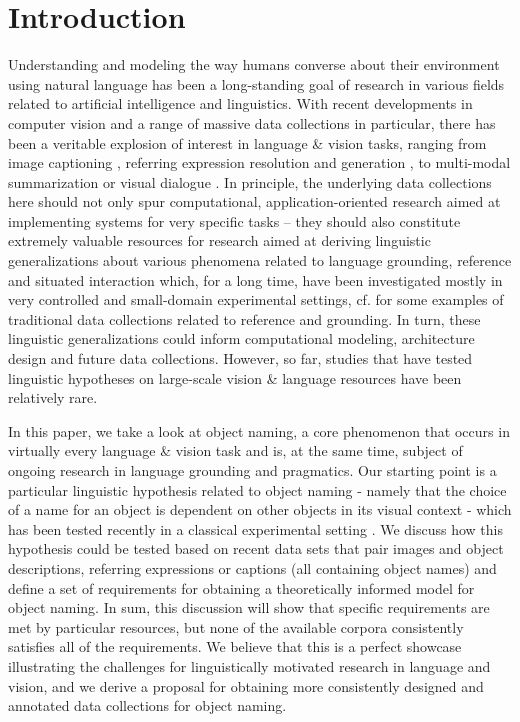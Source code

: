 \documentclass[runningheads]{llncs}
\begin{document}
\section{Introduction}

Understanding and modeling the way humans converse about their environment using natural language has been a long-standing goal of research in various fields related to artificial intelligence and linguistics.
With recent  developments in computer vision and a range of massive data collections in particular, there has been a veritable explosion of interest in language \& vision tasks, ranging from image captioning \cite{fangetal:2015,devlin:imcaqui,Bernardietal:automatic}, referring expression resolution and generation \cite{Kazemzadeh2014,mao15,Yu2016}, to multi-modal summarization or visual dialogue \cite{das2017visual,vries2017guesswhat}.
In principle, the underlying data collections here should not only spur computational, application-oriented research aimed at implementing systems for very specific tasks -- they should also constitute extremely valuable resources for research aimed at deriving linguistic generalizations about various phenomena related to language grounding, reference and situated interaction which, for a long time, have been investigated mostly in very controlled and small-domain experimental settings, cf. \cite{anderson1991hcrc,fernangen:sigd07,krahmer:2012,takenobu2012rex,zarriess2016pentoref} for some examples of traditional data collections related to reference and grounding.  
In turn, these linguistic generalizations could inform computational modeling, architecture design and future data collections.
However, so far, studies that have tested linguistic hypotheses on large-scale vision \& language resources have been relatively rare. 


In this paper, we take a look at object naming, a core phenomenon that occurs in virtually every language \& vision task and is, at the same time, subject of ongoing research in language grounding and pragmatics. 
Our starting point is a particular linguistic hypothesis related to object naming - namely that the choice of a name for an object is dependent on other objects in its visual context - which has been tested recently in a classical experimental setting \cite{graf2016animal}. 
We discuss how this hypothesis could be tested based on recent data sets that pair images and object descriptions, referring expressions or captions (all containing object names) and define a set of requirements for obtaining a theoretically informed model for object naming.
In sum, this discussion will show that specific requirements are met by particular resources, but none of the available corpora consistently satisfies all of the requirements.
We believe that this is a perfect showcase illustrating the challenges for linguistically motivated research in language and vision, and we derive a proposal for obtaining more consistently designed and annotated data collections for object naming.
\end{document}
